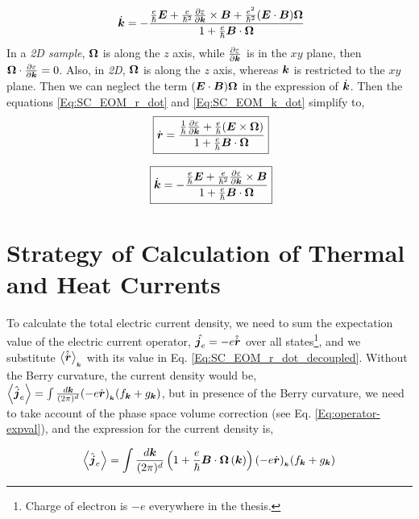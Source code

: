 \documentclass{report}
\renewcommand\vec[1]{\ensuremath\boldsymbol{#1}} %
\begin{document}
\begin{equation}~\label{Eq:SC_EOM_k_dot}
	\dot{\vec{k}} = -\frac{\frac{e}{\hbar} \vec{E} +\frac{e}{\hbar^2} \frac{\partial \varepsilon}{\partial \vec{k}} \times \vec{B} + \frac{e^2}{\hbar^2} (\vec{E}\cdot\vec{B}) \vec{\Omega}}{1 + \frac{e}{\hbar} \vec{B}\cdot\vec{\Omega}}
\end{equation}
In a \textit{2D sample}, $\vec{\Omega}$ is along the $z$ axis, while $\frac{\partial \varepsilon}{\partial \vec{k}}$ is in the $xy$ plane, then $\vec{\Omega} \cdot \frac{\partial \varepsilon}{\partial \vec{k}} = 0$. Also, in \textit{2D}, $\vec{\Omega}$ is along the $z$ axis, whereas $\vec{k}$ is restricted to the $xy$ plane. Then we can neglect the term $(\vec{E}\cdot\vec{B}) \vec{\Omega}$ in the expression of $\dot{\vec{k}}$.
Then the equations \eqref{Eq:SC_EOM_r_dot} and \eqref{Eq:SC_EOM_k_dot} simplify to,
\begin{equation}~\label{Eq:SC_EOM_r_dot_decoupled}
	\boxed{\dot{\vec{r}} = \frac{\frac{1}{\hbar} \frac{\partial \varepsilon}{\partial \vec{k}} + \frac{e}{\hbar} (\vec{E}\times\vec{\Omega})}{1 + \frac{e}{\hbar} \vec{B}\cdot\vec{\Omega}}}
\end{equation}

\begin{equation}~\label{Eq:SC_EOM_k_dot_decoupled}
	\boxed{\dot{\vec{k}} = -\frac{\frac{e}{\hbar} \vec{E} +\frac{e}{\hbar^2} \frac{\partial \varepsilon}{\partial \vec{k}} \times \vec{B}}{1 + \frac{e}{\hbar} \vec{B}\cdot\vec{\Omega}}}
\end{equation}
\chapter{Strategy of Calculation of Thermal and Heat Currents}
To calculate the total electric current density, we need to sum the expectation value of the electric current operator, $\hat{\vec{j}_e} = -e \hat{\dot{\vec{r}}}$ over all states\footnote{Charge of electron is $-e$ everywhere in the thesis.}, and we substitute $\expval{\hat{\dot{\vec{r}}}}_{_{\vec{k}}}$ with its value in Eq. \eqref{Eq:SC_EOM_r_dot_decoupled}. Without the Berry curvature, the current density would be, $\expval{\hat{\vec{j}}_e} = \int \frac{d\vec{k}}{(2\pi)^d} (- e \dot{\vec{r}})_{_{\vec{k}}} ({f}_{\vec{k}} + {g}_{\vec{k}})$, but in presence of the Berry curvature, we need to take account of the phase space volume correction (see Eq. \eqref{Eq:operator-expval}), and the expression for the current density is,

\begin{equation} \label{Eq:electric-current}
	\expval{\hat{\vec{j}}_e} = \int \frac{d\vec{k}}{(2\pi)^d} \left(1 + \frac{e}{\hbar} \vec{B} \cdot  \vec{\Omega}\left(\vec{k}\right)\right) (- e \dot{\vec{r}})_{_{\vec{k}}} ({f}_{\vec{k}} + {g}_{\vec{k}})
\end{equation}
\end{document}
